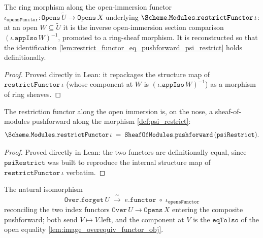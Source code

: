 \begin{definition}\leanok
  \label{def:psi_restrict}
  The ring morphism along the open-immersion functor
  \(\iota_{\mathtt{opensFunctor}} : \mathtt{Opens}\,\widetilde{U} \to
  \mathtt{Opens}\,X\) underlying \(\Scheme.\mathtt{Modules.restrictFunctor}\,\iota\):
  at an open \(W \subseteq \widetilde{U}\) it is the inverse open-immersion section
  comparison \((\iota.\mathtt{appIso}\,W)^{-1}\), promoted to a ring-sheaf morphism.
  It is reconstructed so that the identification
  \cref{lem:restrict_functor_eq_pushforward_psi_restrict} holds definitionally.
\end{definition}

\begin{proof}

\leanok
  Proved directly in Lean: it repackages the structure map of
  \(\mathtt{restrictFunctor}\,\iota\) (whose component at \(W\) is
  \((\iota.\mathtt{appIso}\,W)^{-1}\)) as a morphism of ring sheaves.
\end{proof}

\begin{lemma}\leanok
  \label{lem:restrict_functor_eq_pushforward_psi_restrict}
  The restriction functor along the open immersion is, on the nose, a sheaf-of-modules
  pushforward along the morphism \cref{def:psi_restrict}:
  \[
    \Scheme.\mathtt{Modules.restrictFunctor}\,\iota
      \;=\; \mathtt{SheafOfModules.pushforward}\,(\mathtt{psiRestrict}).
  \]
\end{lemma}

\begin{proof}
  \leanok
  Proved directly in Lean: the two functors are definitionally equal, since
  \(\mathtt{psiRestrict}\) was built to reproduce the internal structure map of
  \(\mathtt{restrictFunctor}\,\iota\) verbatim.
\end{proof}

\begin{definition}\leanok
  \label{def:over_forget_nat_iso}
  The natural isomorphism
  \[
    \mathtt{Over.forget}\,U \;\xrightarrow{\ \sim\ }\;
      e.\mathtt{functor} \;\circ\; \iota_{\mathtt{opensFunctor}}
  \]
  reconciling the two index functors \(\mathtt{Over}\,U \to \mathtt{Opens}\,X\)
  entering the composite pushforward; both send \(V \mapsto V.\mathrm{left}\), and the
  component at \(V\) is the \(\mathtt{eqToIso}\) of the open equality
  \cref{lem:image_overequiv_functor_obj}.
\end{definition}

